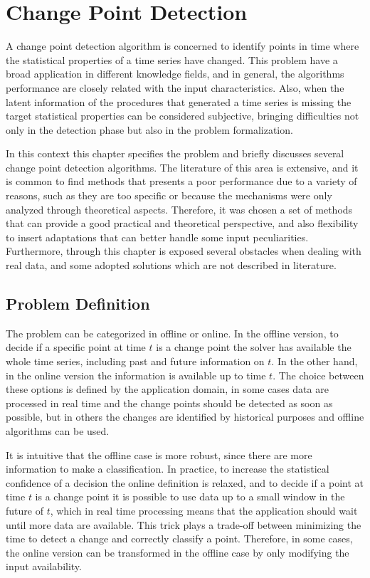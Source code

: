 \chapter{Change Point Detection} 

A change point detection algorithm is concerned to identify points in time where the statistical properties of a time series have changed. This problem have a broad application in different knowledge fields, and in general, the algorithms performance are closely related with the input characteristics. Also, when the latent information of the procedures that generated a time series is missing the target statistical properties can be considered subjective, bringing difficulties not only in the detection phase but also in the problem formalization.

In this context this chapter specifies the problem and briefly discusses several change point detection algorithms. The literature of this area is extensive, and it is common to find methods that presents a poor performance due to a variety of reasons, such as they are too specific or because the mechanisms were only analyzed through theoretical aspects. Therefore, it was chosen a set of methods that can provide a good practical and theoretical perspective, and also flexibility to insert adaptations that can better handle some input peculiarities. Furthermore, through this chapter is exposed several obstacles when dealing with real data, and some adopted solutions which are not described in literature.

\section{Problem Definition}

The problem can be categorized in offline or online. In the offline version, to decide if a specific point at time $t$ is a change point the solver has available the whole time series, including past and future information on $t$. In the other hand, in the online version the information is available up to time $t$. The choice between these options is defined by the application domain, in some cases data are processed in real time and the change points should be detected as soon as possible, but in others the changes are identified by historical purposes and offline algorithms can be used. 

It is intuitive that the offline case is more robust, since there are more information to make a classification. In practice, to increase the statistical confidence of a decision the online definition is relaxed, and to decide if a point at time $t$ is a change point it is possible to use data up to a small window in the future of $t$, which in real time processing means that the application should wait until more data are available. This trick plays a trade-off between minimizing the time to detect a change and correctly classify a point. Therefore, in some cases, the online version can be transformed in the offline case by only modifying the input availability. 

